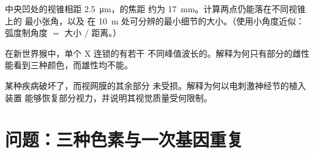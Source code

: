 \begin{exercise}[$\star\star\star$]\label{exo:g11:the-eye:13}
中央凹处的视锥相距 \qty{2.5}{\micro m}，的焦距
约为 \qty{17}{mm}。计算两点仍能落在不同视锥上的
最小张角，以及
在 \qty{10}{m} 处可分辨的最小细节的大小。（使用小角度近似：
弧度制角度 $=$ 大小 $/$ 距离。）
\end{exercise}

\begin{exercise}[$\star\star\star$]\label{exo:g11:the-eye:14}
在新世界猴中，单个 X 连锁的有若干
不同峰值波长的。解释为何只有部分的雌性
能看到三种颜色，而雄性均不能。
\end{exercise}

\begin{exercise}[$\star\star\star$]\label{exo:g11:the-eye:15}
某种疾病破坏了，而视网膜的其余部分
未受损。解释为何以电刺激神经节的植入装置
能够恢复部分视力，并说明其视觉质量受何限制。
\end{exercise}

\section{问题：三种色素与一次基因重复}

